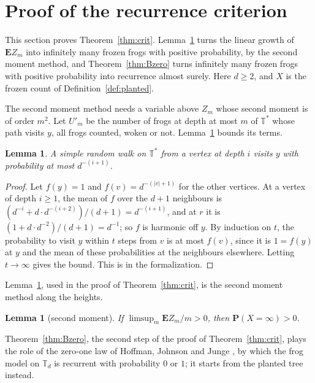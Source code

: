 \documentclass[11pt]{amsart}
\newtheorem{lemma}[theorem]{Lemma}
\theoremstyle{definition}
\numberwithin{equation}{section}
\newcommand{\lean}[1]{\ignorespaces}
\newcommand{\T}{\mathbb{T}}
\newcommand{\Ts}{\mathbb{T}^{*}}
\newcommand{\E}{\mathbf{E}}
\renewcommand{\P}{\mathbf{P}}
\begin{document}
\section{Proof of the recurrence criterion}\label{sec:crit}

This section proves Theorem~\ref{thm:crit}. Lemma~\ref{lem:secondmoment} turns the linear growth of $\E Z_m$ into infinitely many frozen frogs with positive probability, by the second moment method, and Theorem~\ref{thm:Bzero} turns infinitely many frozen frogs with positive probability into recurrence almost surely. Here $d\ge2$, and $X$ is the frozen count of Definition~\ref{def:planted}.

The second moment method needs a variable above $Z_m$ whose second moment is of order $m^2$. Let $U'_m$ be the number of frogs at depth at most $m$ of $\Ts$ whose path visits $y$, all frogs counted, woken or not. Lemma~\ref{lem:hit} bounds its terms.

\begin{lemma}\label{lem:hit}\lean{FrogModel.LemmaR.hitStar_le}
A simple random walk on $\Ts$ from a vertex at depth $i$ visits $y$ with probability at most $d^{-(i+1)}$.
\end{lemma}

\begin{proof}
Let $f(y)=1$ and $f(v)=d^{-(|v|+1)}$ for the other vertices. At a vertex of depth $i\ge1$, the mean of $f$ over the $d+1$ neighbours is $(d^{-i}+d\cdot d^{-(i+2)})/(d+1)=d^{-(i+1)}$, and at $r$ it is $(1+d\cdot d^{-2})/(d+1)=d^{-1}$; so $f$ is harmonic off $y$. By induction on $t$, the probability to visit $y$ within $t$ steps from $v$ is at most $f(v)$, since it is $1=f(y)$ at $y$ and the mean of these probabilities at the neighbours elsewhere. Letting $t\to\infty$ gives the bound. This is  in the formalization.
\end{proof}

Lemma~\ref{lem:secondmoment}, used in the proof of Theorem~\ref{thm:crit}, is the second moment method along the heights.

\begin{lemma}[second moment]\label{lem:secondmoment}\lean{FrogModel.LemmaR.plantedLemmaR', FrogModel.LemmaR.measure_top_pos_of_linear, FrogModel.LemmaR.paleyZygmund}
If $\limsup_m\E Z_m/m>0$, then $\P(X=\infty)>0$.
\end{lemma}

Theorem~\ref{thm:Bzero}, the second step of the proof of Theorem~\ref{thm:crit}, plays the role of the zero-one law of Hoffman, Johnson and Junge \cite[Theorem~4]{HJJ17}, by which the frog model on $\T_d$ is recurrent with probability $0$ or $1$; it starts from the planted tree instead.
\end{document}
